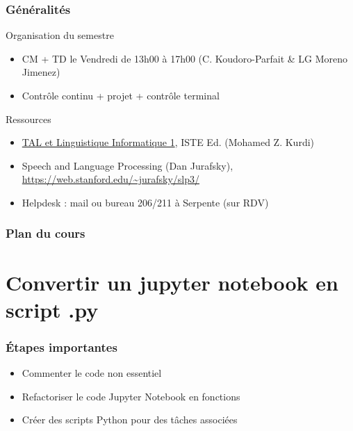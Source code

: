 \begin{frame}
  \frametitle{Généralités}
  \begin{block}{Organisation du semestre}
 \begin{itemize}
   \item CM + TD le Vendredi de 13h00 à 17h00 (C. Koudoro-Parfait \& LG Moreno Jimenez)
   \item Contrôle continu + projet + contrôle terminal
  
  \end{itemize}
  \end{block}
\begin{block}{Ressources}
  \begin{itemize}
  \item \href{http://paris-sorbonne.hosted.exlibrisgroup.com/F?func=find-c&ccl_term=idn=ppn199563403&local_base=MAH01}{TAL et Linguistique Informatique 1}, ISTE Ed. (Mohamed Z. Kurdi) 
  \item Speech and Language Processing (Dan Jurafsky), \url{https://web.stanford.edu/~jurafsky/slp3/} 
  \item Helpdesk : mail ou bureau 206/211 à Serpente (sur RDV)
  \end{itemize}
   \end{block}
\end{frame}

\begin{frame}
  \frametitle{Plan du cours}
\tableofcontents

\end{frame}
\section{Convertir un jupyter notebook en script .py}


\begin{frame}
 \frametitle{Étapes importantes}
\begin{itemize}

\item Commenter le code non essentiel 

\item Refactoriser le code Jupyter Notebook en fonctions

\item Créer des scripts Python pour des tâches associées

\end{itemize} 
\end{frame}

